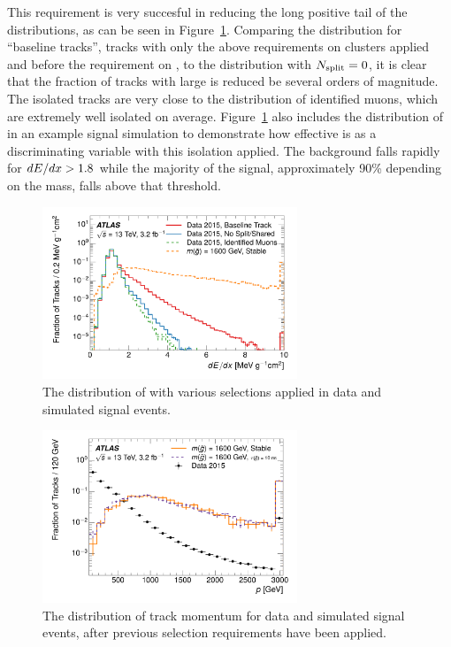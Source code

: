 This requirement is very succesful in reducing the long positive tail of the \dedx distributions, as can be seen in Figure~\ref{fig:dedx_isolation}.
Comparing the distribution for ``baseline tracks'', tracks with only the above requirements on clusters applied and before the requirement on \Nsplit, to the distribution with $N_{\mathrm{split}} = 0$, it is clear that the fraction of tracks with large \dedx is reduced be several orders of magnitude.
The isolated tracks are very close to the \dedx distribution of identified muons, which are extremely well isolated on average. 
Figure~\ref{fig:dedx_isolation} also includes the distribution of \dedx in an example signal simulation to demonstrate how effective \dedx is as a discriminating variable with this isolation applied. 
The background falls rapidly for $dE/dx > 1.8$ \MeVgcm while the majority of the signal, approximately 90\% depending on the mass, falls above that threshold.

\begin{figure}[h]
\centering
\includegraphics[width=0.68\textwidth]{figures/dedx_isolation.pdf}
\caption{The distribution of \dedx with various selections applied in data and simulated signal events.}
\label{fig:dedx_isolation}
\end{figure}



\begin{figure}[h]
\centering
\includegraphics[width=0.68\textwidth]{figures/selection_p_nm1.pdf}
\caption{The distribution of track momentum for data and simulated signal events, after previous selection requirements have been applied.}
\label{fig:nm1_p}
\end{figure}

